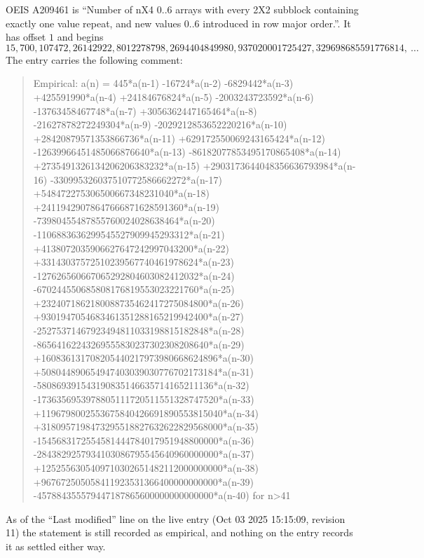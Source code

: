 \documentclass[11pt,a4paper]{article}
\theoremstyle{plain}
\theoremstyle{definition}
\begin{document}
OEIS A209461 is ``Number of nX4 0..6 arrays with every 2X2 subblock containing exactly one value repeat, and new values 0..6 introduced in row major order.''. It has offset $1$ and begins
\[
15, 700, 107472, 26142922, 8012278798, 2694404849980, 937020001725427, 329698685591776814,\ \dots
\]
The entry carries the following comment:
\begin{quote}\small
Empirical: a(n) = 445*a(n-1) -16724*a(n-2) -6829442*a(n-3) +425591990*a(n-4) +24184676824*a(n-5) -2003243723592*a(n-6) -13763458467748*a(n-7) +3056362447165464*a(n-8) -21627878272249304*a(n-9) -2029212853652220216*a(n-10) +28420879571353866736*a(n-11) +629172550069243165424*a(n-12) -12639966451485066876640*a(n-13) -86182077853495170865408*a(n-14) +2735491326134206206383232*a(n-15) +2903173644048356636793984*a(n-16) -330995326037510772586662272*a(n-17) +548472275306500667348231040*a(n-18) +24119429078647666871628591360*a(n-19) -73980455487855760024028638464*a(n-20) -1106883636299545527909945293312*a(n-21) +4138072035906627647242997043200*a(n-22) +33143037572510239567740461978624*a(n-23) -127626560667065292804603082412032*a(n-24) -670244550685808176819553023221760*a(n-25) +2324071862180088735462417275084800*a(n-26) +9301947054683461351288165219942400*a(n-27) -25275371467923494811033198815182848*a(n-28) -86564162243269555830237302308208640*a(n-29) +160836131708205440217973980668624896*a(n-30) +508044890654947403039030776702173184*a(n-31) -580869391543190835146635714165211136*a(n-32) -1736356953978805111720511551328747520*a(n-33) +1196798002553675840426691890553815040*a(n-34) +3180957198473295518827632622829568000*a(n-35) -1545683172554581444784017951948800000*a(n-36) -2843829257934103086795545640960000000*a(n-37) +1252556305409710302651482112000000000*a(n-38) +967672505058411923531366400000000000*a(n-39) -457884355579447187865600000000000000*a(n-40) for n>41
\end{quote}
As of the ``Last modified'' line on the live entry (Oct 03 2025 15:15:09, revision 11) the statement is
still recorded as empirical, and nothing on the entry records it as settled either way.
\end{document}
